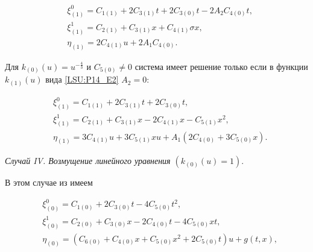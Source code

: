 \begin{align*}

& \xi^0_{(1)} = C_{1(1)}+2C_{3(1)}t+2C_{3(0)}t-2 A_2 C_{4(0)}t,  \\

& \xi^1_{(1)} = C_{2(1)}+C_{3(1)}x+C_{4(1)} \sigma x, \\

& \eta_{(1)} = 2C_{4(1)} u + 2 A_1 C_{4(0)}.

\end{align*}



Для $k_{(0)}(u)=u^{-\frac{4}{3}}$ и $C_{5(0)} \neq 0$ система имеет решение только если в функции $k_{(1)}(u)$ вида \eqref{LSU:P14_E2} $A_2=0$: 






\begin{align*}

& \xi^0_{(1)} = C_{1(1)}+2C_{3(1)}t+2C_{3(0)}t,  \\

& \xi^1_{(1)} = C_{2(1)}+C_{3(1)}x-2C_{4(1)} x-C_{5(1)} x^2, \\

& \eta_{(1)} = 3C_{4(1)} u + 3 C_{5(1)} xu+A_1 \left(2C_{4(0)}+3C_{5(0)}x\right).

\end{align*}



\vspace{2mm}

\textit{Случай IV. Возмущение линейного уравнения $(k_{(0)}(u)=1).$}



В этом случае из \cite{LSU:Ovs} имеем 

\begin{align}

& \xi^0_{(0)} = C_{1(0)}+2C_{3(0)}t-4C_{5(0)}t^2, \nonumber \\

& \xi^1_{(0)} = C_{2(0)}+C_{3(0)}x-2C_{4(0)}t-4C_{5(0)}xt, \label{LSU:X0_k1}\\

& \eta_{(0)} = (C_{6(0)}+C_{4(0)} x +C_{5(0)} x^2 +2 C_{5(0)} t)u+g(t,x), \nonumber

\end{align}

